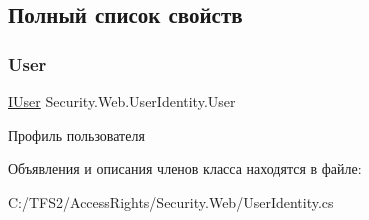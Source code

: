 \subsection{Полный список свойств}
\mbox{\label{class_security_1_1_web_1_1_user_identity_a0569265b4eb6d169cd2271600e642fcf}} 
\subsubsection{\texorpdfstring{User}{User}}
{\footnotesize\ttfamily \hyperlink{interface_security_1_1_interfaces_1_1_model_1_1_i_user}{I\+User} Security.\+Web.\+User\+Identity.\+User\hspace{0.3cm}{\ttfamily [get]}}



Профиль пользователя 



Объявления и описания членов класса находятся в файле\+:\begin{DoxyCompactItemize}
\item 
C\+:/\+T\+F\+S2/\+Access\+Rights/\+Security.\+Web/User\+Identity.\+cs\end{DoxyCompactItemize}
